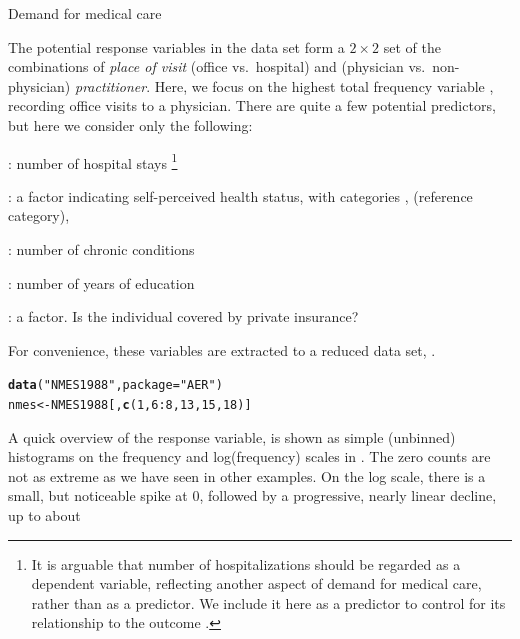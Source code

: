 \documentclass[11pt]{book}\usepackage[]{graphicx}\usepackage[]{color}
\makeatletter
\newcommand{\hlnum}[1]{\textcolor[rgb]{0.686,0.059,0.569}{#1}}%
\newcommand{\hlstr}[1]{\textcolor[rgb]{0.192,0.494,0.8}{#1}}%
\newcommand{\hlopt}[1]{\textcolor[rgb]{0,0,0}{#1}}%
\newcommand{\hlstd}[1]{\textcolor[rgb]{0.345,0.345,0.345}{#1}}%
\newcommand{\hlkwb}[1]{\textcolor[rgb]{0.69,0.353,0.396}{#1}}%
\newcommand{\hlkwc}[1]{\textcolor[rgb]{0.333,0.667,0.333}{#1}}%
\newcommand{\hlkwd}[1]{\textcolor[rgb]{0.737,0.353,0.396}{\textbf{#1}}}%
\newenvironment{kframe}{%
 \def\at@end@of@kframe{}%
 \ifinner\ifhmode%
  \def\at@end@of@kframe{\end{minipage}}%
  \begin{minipage}{\columnwidth}%
 \fi\fi%
 \def\FrameCommand##1{\hskip\@totalleftmargin \hskip-\fboxsep
 \colorbox{shadecolor}{##1}\hskip-\fboxsep
     \hskip-\linewidth \hskip-\@totalleftmargin \hskip\columnwidth}%
 \MakeFramed {\advance\hsize-\width
   \@totalleftmargin\z@ \linewidth\hsize
   \@setminipage}}%
 {\par\unskip\endMakeFramed%
 \at@end@of@kframe}
\newenvironment{knitrout}{}{} %
\renewenvironment{knitrout}{\small\renewcommand{\baselinestretch}{.85}}{} %
\makeatother
\begin{document}
\begin{Example}[nmes1]{Demand for medical care}

The potential response variables in the  data set
form a $2 \times 2$ set of the combinations
of \emph{place of visit} (office vs.\ hospital) and (physician vs.\ non-physician) \emph{practitioner}.
Here, we focus on the highest total frequency
variable , recording office visits to a physician.
There are quite a few potential predictors, but here we consider only
the following:
\begin{itemize*}
\item {}: number of hospital stays%
\footnote{
It is arguable that number of hospitalizations should be regarded as a
dependent variable, reflecting another aspect of demand for medical care,
rather than as a predictor.  We include it here as a predictor to control
for its relationship to the outcome .
}
\item {}: a factor indicating self-perceived health status, with categories
  ,  (reference category), 
\item {}:  number of chronic conditions
\item {}
\item {}:  number of years of education
\item {}: a factor. Is the individual covered by private insurance?
\end{itemize*}
For convenience, these variables are extracted to a reduced data set, .
\begin{knitrout}
\color{fgcolor}\begin{kframe}
\begin{alltt}
\hlkwd{data}\hlstd{(}\hlstr{"NMES1988"}\hlstd{,} \hlkwc{package}\hlstd{=}\hlstr{"AER"}\hlstd{)}
\hlstd{nmes} \hlkwb{<-} \hlstd{NMES1988[,} \hlkwd{c}\hlstd{(}\hlnum{1}\hlstd{,} \hlnum{6}\hlopt{:}\hlnum{8}\hlstd{,} \hlnum{13}\hlstd{,} \hlnum{15}\hlstd{,} \hlnum{18}\hlstd{)]}
\end{alltt}
\end{kframe}
\end{knitrout}
A quick overview of the response variable,  is shown as simple (unbinned) histograms
on the frequency and log(frequency) scales in .
The zero counts are not as extreme as we have seen in other examples. On the log scale, there
is a small, but noticeable spike at 0, followed by a progressive, nearly linear decline, up to about

\end{Example}
\end{document}
